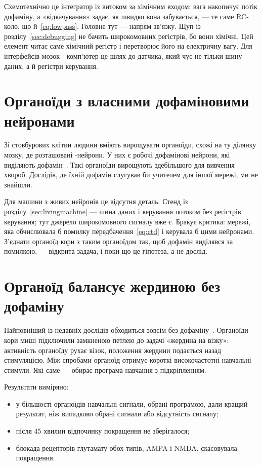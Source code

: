 Схемотехнічно це інтегратор із витоком за хімічним входом: вага накопичує потік дофаміну, а «відкачування» задає, як швидко вона забувається, --- те саме RC-коло, що й~\eqref{eq:lowpass}. Головне тут --- напрям зв'язку. Щуп із розділу~\ref{sec:debugging} не бачить широкомовних регістрів, бо вони хімічні. Цей елемент читає саме хімічний регістр і перетворює його на електричну вагу. Для інтерфейсів мозок---комп'ютер це шлях до датчика, який чує не тільки шину даних, а й регістри керування.

\section{Органоїди з власними дофаміновими нейронами}
\label{sec:midbrainorg}

Зі стовбурових клітин людини вміють вирощувати органоїди, схожі на ту ділянку мозку, де розташовані -нейрони. У них є робочі дофамінові нейрони, які виділяють дофамін~\cite{Jo2016}. Такі органоїди вирощують здебільшого для вивчення хвороб. Дослідів, де їхній дофамін слугував би учителем для іншої мережі, ми не знайшли.

Для машини з живих нейронів це відсутня деталь. Стенд із розділу~\ref{sec:livingmachine} --- шина даних і керування потоком без регістрів керування; тут джерело широкомовного сигналу вже є. Бракує критика: мережі, яка обчислювала б помилку передбачення~\eqref{eq:ctd} і керувала б цими нейронами. З'єднати органоїд кори з таким органоїдом так, щоб дофамін виділявся за помилкою, --- відкрита задача, і поки що це гіпотеза, а не дослід.

\section{Органоїд балансує жердиною без дофаміну}
\label{sec:cartpole}

Найповніший із недавніх дослідів обходиться зовсім без дофаміну~\cite{Robbins2026}. Органоїди кори миші підключили замкненою петлею до задачі «жердина на візку»: активність органоїду рухає візок, положення жердини подається назад стимуляцією. Між спробами органоїд отримує короткі високочастотні навчальні стимули. Які саме --- обирає програма навчання з підкріпленням.

Результати виміряно:
\begin{itemize}
\item у більшості органоїдів навчальні сигнали, обрані програмою, дали кращий результат, ніж випадково обрані сигнали або відсутність сигналу;
\item після $45$ хвилин відпочинку покращення не зберігалося;
\item блокада рецепторів глутамату обох типів, AMPA і NMDA, скасовувала покращення.
\end{itemize}

